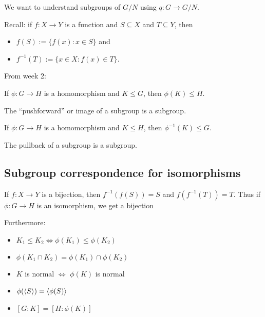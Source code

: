 \documentclass[12pt,letterpaper]{report}
\begin{document}
We want to understand subgroups of $G/N$ using $q \colon G \to G/N$.

Recall: if $f \colon X \to Y$ is a function and $S \subseteq X$ and $T \subseteq Y$, then
\begin{itemize}
  \item $f(S) := \{f(x) : x \in S\}$ and
  \item $f^{-1}(T) := \{x \in X : f(x) \in T\}$.
\end{itemize}

From week 2:

\begin{prop}{}{}
  If $\phi \colon G \to H$ is a homomorphism and $K \leq G$, then $\phi(K) \leq H$.
\end{prop}

The ``pushforward'' or image of a subgroup is a subgroup.

\begin{prop}{}{}
  If $\phi \colon G \to H$ is a homomorphism and $K \leq H$, then $\phi^{-1}(K) \leq G$.
\end{prop}

The pullback of a subgroup is a subgroup.

\pagebreak
\subsection{Subgroup correspondence for isomorphisms}

If $f \colon X \to Y$ is a bijection, then $f^{-1}(f(S)) = S$ and $f(f^{-1}(T)) = T$.
Thus if $\phi \colon G \to H$ is an isomorphism, we get a bijection
\begin{center}
\end{center}

Furthermore:
\begin{itemize}
  \item $K_1 \leq K_2 \iff \phi(K_1) \leq \phi(K_2)$
  \item $\phi(K_1 \cap K_2) = \phi(K_1) \cap \phi(K_2)$
  \item $K$ is normal $\iff$ $\phi(K)$ is normal
  \item $\phi(\langle S\rangle) = \langle\phi(S)\rangle$
  \item $[G : K] = [H : \phi(K)]$
\end{itemize}
\end{document}

